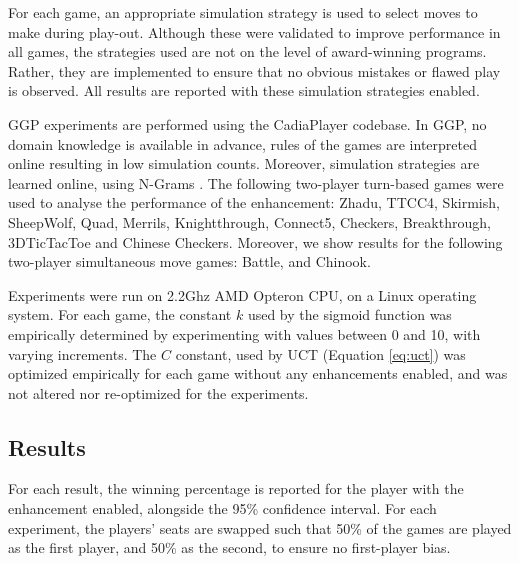 \documentclass{ecai2014}
\begin{document}
For each game, an appropriate simulation strategy is used to select moves to make during play-out. Although these were validated to improve performance in all games, the strategies used are not on the level of award-winning programs. Rather, they are implemented to ensure that no obvious mistakes or flawed play is observed. All results are reported with these simulation strategies enabled.

GGP experiments are performed using the {\sc CadiaPlayer} codebase. In GGP, no domain knowledge is available in advance, rules of the games are interpreted online resulting in low simulation counts. Moreover, simulation strategies are learned online, using N-Grams \cite{takngrams}. The following two-player turn-based games were used to analyse the performance of the enhancement: Zhadu, TTCC4, Skirmish, SheepWolf, Quad, Merrils, Knightthrough, Connect5, Checkers, Breakthrough, 3DTicTacToe and Chinese Checkers. Moreover, we show results for the following two-player simultaneous move games: Battle, and Chinook.

Experiments were run on 2.2Ghz AMD Opteron CPU, on a Linux operating system. For each game, the constant $k$ used by the sigmoid function was empirically determined by experimenting with values between 0 and 10, with varying increments. The $C$ constant, used by UCT (Equation \ref{eq:uct}) was optimized empirically for each game without any enhancements enabled, and was not altered nor re-optimized for the experiments.
\subsection{Results}
\label{subsec:results}
For each result, the winning percentage is reported for the player with the enhancement enabled, alongside the 95\% confidence interval. For each experiment, the players' seats are swapped such that 50\% of the games are played as the first player, and 50\% as the second, to ensure no first-player bias.
\end{document}
